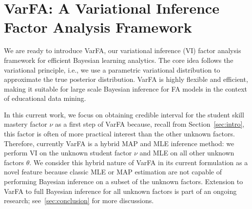 \documentclass{edm_article}
\newcommand{\ml}[1]{\textcolor{orange}{\bf [LAN bandit: #1]}}
\newcommand{\jack}[1]{\textcolor{purple}{\bf [jack the ripper: #1]}}
\begin{document}

\section{V{\normalfont\textbf{ar}}FA: A Variational Inference Factor Analysis Framework}
\label{sec:method}
We are ready to introduce VarFA, our variational inference (VI) factor analysis framework for efficient Bayesian learning analytics. The core idea follows the variational principle, i.e., we use a parametric variational distribution to approximate the true posterior distribution. VarFA is highly flexible and efficient, making it suitable for large scale Bayesian inference for FA models in the context of educational data mining. 

In this current work, we focus on obtaining credible interval for the student skill mastery factor $\nu$ as a first step of VarFA because, recall from Section~\ref{sec:intro}, this factor is often of more practical interest than the other unknown factors. Therefore, currently VarFA is a hybrid MAP and MLE inference method: we perform VI on the unknown student factor $\nu$ and MLE on all other unknown factors $\theta$. We consider this hybrid nature of VarFA in its current formulation as a novel feature because classic MLE or MAP estimation are not capable of performing Bayesian inference on a subset of the unknown factors.
Extension to VarFA to full Bayesian inference for all unknown factors is part of an ongoing research; see~\ref{sec:conclusion} for more discussions.

\end{document}
